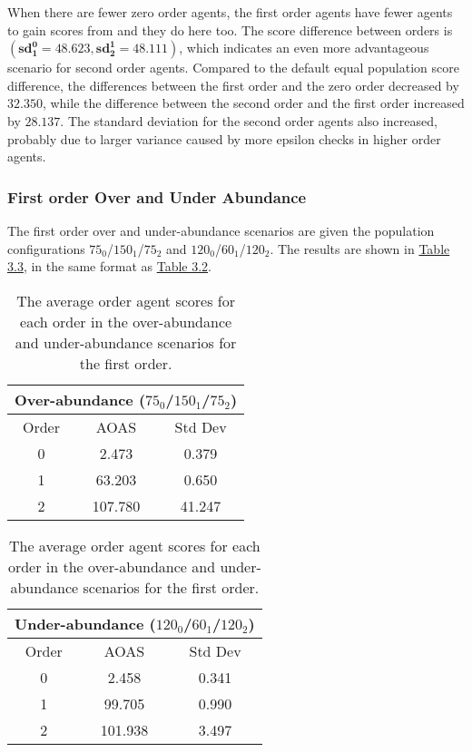 When there are fewer zero order agents, the first order agents have fewer agents to gain scores from and they do here too. The score difference between orders is $(\mathbf{sd^0_1 = 48.623}, \mathbf{sd^1_2 = 48.111})$, which indicates an even more advantageous scenario for second order agents. Compared to the default equal population score difference, the differences between the first order and the zero order decreased by $\mathbf{32.350}$, while the difference between the second order and the first order increased by $\mathbf{28.137}$. The standard deviation for the second order agents also increased, probably due to larger variance caused by more epsilon checks in higher order agents.

\subsubsection{First order Over and Under Abundance}

The first order over and under-abundance scenarios are given the population configurations $75_{0}$/$150_{1}$/$75_{2}$ and $120_{0}$/$60_{1}$/$120_{2}$. The results are shown in \hyperref[table:non-sig-first-order-simple]{Table 3.3}, in the same format as \hyperref[table:non-sig-zero-order-simple]{Table 3.2}.

\begin{table}[h]
\centering
\begin{tabular}{|c|c|c|}
\hline
\multicolumn{3}{|c|}{Over-abundance ($75_{0}$/$150_{1}$/$75_{2}$)} \\
\hline
Order & AOAS & Std Dev \\
\hline
0     & 2.473    & 0.379    \\
1     & 63.203   & 0.650    \\
2     & 107.780  & 41.247   \\
\hline
\end{tabular}
\qquad
\begin{tabular}{|c|c|c|}
\hline
\multicolumn{3}{|c|}{Under-abundance ($120_{0}$/$60_{1}$/$120_{2}$)} \\
\hline
Order & AOAS & Std Dev \\
\hline
0     & 2.458   & 0.341  \\
1     & 99.705  & 0.990  \\
2     & 101.938 & 3.497  \\
\hline
\end{tabular}
\caption{The average order agent scores for each order in the over-abundance and under-abundance scenarios for the first order.}
\label{table:non-sig-first-order-simple}
\end{table}

